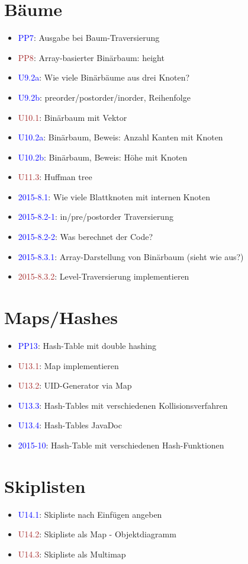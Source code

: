 \documentclass[a4paper]{article}
\newcommand{\ub}[1]{\textcolor{blue}{#1}}
\newcommand{\ubc}[1]{\textcolor{brown}{#1}}
\begin{document}
\section{Bäume}
\begin{itemize}
  \item \ub{PP7}: Ausgabe bei Baum-Traversierung
  \item \ubc{PP8}: Array-basierter Binärbaum: height
  \item \ub{U9.2a}: Wie viele Binärbäume aus drei Knoten?
  \item \ub{U9.2b}: preorder/postorder/inorder, Reihenfolge
  \item \ubc{U10.1}: Binärbaum mit Vektor
  \item \ub{U10.2a}: Binärbaum, Beweis: Anzahl Kanten mit Knoten
  \item \ub{U10.2b}: Binärbaum, Beweis: Höhe mit Knoten
  \item \ubc{U11.3}: Huffman tree
  \item \ub{2015-8.1}: Wie viele Blattknoten mit internen Knoten
  \item \ub{2015-8.2-1}: in/pre/postorder Traversierung
  \item \ub{2015-8.2-2}: Was berechnet der Code?
  \item \ub{2015-8.3.1}: Array-Darstellung von Binärbaum (sieht wie aus?)
  \item \ubc{2015-8.3.2}: Level-Traversierung implementieren
\end{itemize}

\section{Maps/Hashes}
\begin{itemize}
  \item \ub{PP13}: Hash-Table mit double hashing
  \item \ubc{U13.1}: Map implementieren
  \item \ubc{U13.2}: UID-Generator via Map
  \item \ub{U13.3}: Hash-Tables mit verschiedenen Kollisionsverfahren
  \item \ub{U13.4}: Hash-Tables JavaDoc
  \item \ub{2015-10}: Hash-Table mit verschiedenen Hash-Funktionen
\end{itemize}

\section{Skiplisten}
\begin{itemize}
  \item \ub{U14.1}: Skipliste nach Einfügen angeben
  \item \ubc{U14.2}: Skipliste als Map - Objektdiagramm
  \item \ubc{U14.3}: Skipliste als Multimap
\end{itemize}
\end{document}
